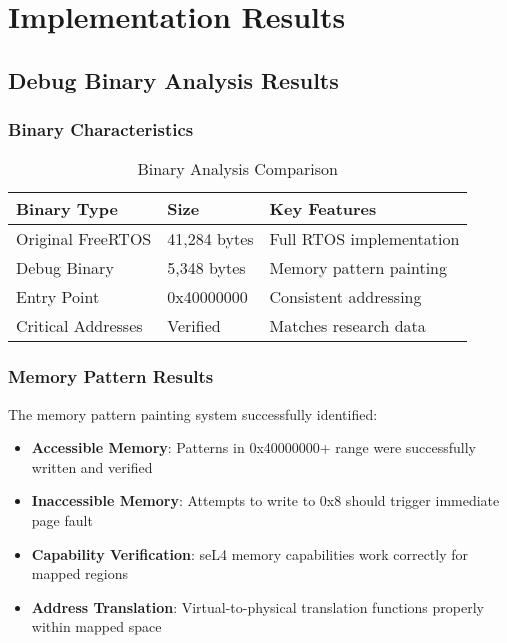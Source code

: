 \documentclass[11pt,a4paper]{article}
\begin{document}
\section{Implementation Results}

\subsection{Debug Binary Analysis Results}

\subsubsection{Binary Characteristics}

\begin{table}[h]
\centering
\begin{tabular}{@{}lll@{}}
\toprule
\textbf{Binary Type} & \textbf{Size} & \textbf{Key Features} \\
\midrule
Original FreeRTOS & 41,284 bytes & Full RTOS implementation \\
Debug Binary & 5,348 bytes & Memory pattern painting \\
Entry Point & 0x40000000 & Consistent addressing \\
Critical Addresses & Verified & Matches research data \\
\bottomrule
\end{tabular}
\caption{Binary Analysis Comparison}
\label{tab:binary_results}
\end{table}

\subsubsection{Memory Pattern Results}

The memory pattern painting system successfully identified:

\begin{itemize}
    \item \textbf{Accessible Memory}: Patterns in 0x40000000+ range were successfully written and verified
    \item \textbf{Inaccessible Memory}: Attempts to write to 0x8 should trigger immediate page fault
    \item \textbf{Capability Verification}: seL4 memory capabilities work correctly for mapped regions
    \item \textbf{Address Translation}: Virtual-to-physical translation functions properly within mapped space
\end{itemize}
\end{document}
